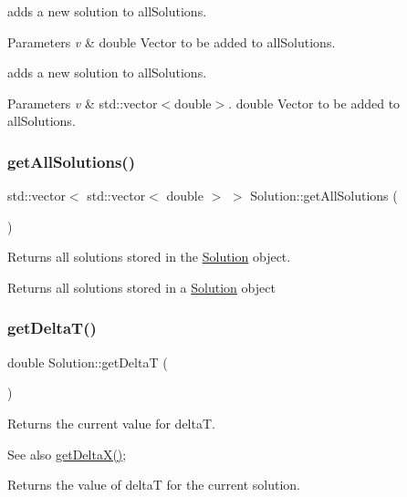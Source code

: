 adds a new solution to all\+Solutions. 
\begin{DoxyParams}{Parameters}
{\em v} & double Vector to be added to all\+Solutions.\\
\hline
\end{DoxyParams}
adds a new solution to all\+Solutions. 
\begin{DoxyParams}{Parameters}
{\em v} & std\+::vector$<$double$>$. double Vector to be added to all\+Solutions. \\
\hline
\end{DoxyParams}
\mbox{\label{class_solution_abd28abd062adb793866fd5e1c8ef8639}} 
\subsubsection{\texorpdfstring{get\+All\+Solutions()}{getAllSolutions()}}
{\footnotesize\ttfamily std\+::vector$<$ std\+::vector$<$ double $>$ $>$ Solution\+::get\+All\+Solutions (\begin{DoxyParamCaption}{ }\end{DoxyParamCaption})}

Returns all solutions stored in the \hyperlink{class_solution}{Solution} object.

Returns all solutions stored in a \hyperlink{class_solution}{Solution} object \mbox{\label{class_solution_ab5e6d31c8b567a20dce17b802242bd02}} 
\subsubsection{\texorpdfstring{get\+Delta\+T()}{getDeltaT()}}
{\footnotesize\ttfamily double Solution\+::get\+DeltaT (\begin{DoxyParamCaption}{ }\end{DoxyParamCaption})}

Returns the current value for deltaT. \begin{DoxySeeAlso}{See also}
\hyperlink{class_solution_a45756ea0f3bbd5a69e1ddcd12379f398}{get\+Delta\+X()};
\end{DoxySeeAlso}
Returns the value of deltaT for the current solution. \mbox{\label{class_solution_a45756ea0f3bbd5a69e1ddcd12379f398}} 
